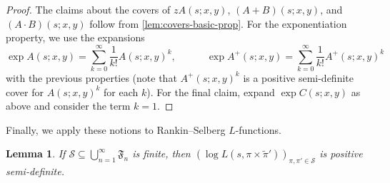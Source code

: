 \documentclass[11pt]{amsart}
\newtheorem{lemma}[theorem]{Lemma}
\theoremstyle{remark}
\numberwithin{equation}{section}
\newcommand{\mS}{\mathcal{S}}
\renewcommand{\tilde}{\widetilde}
\begin{document}
\begin{proof}
The claims about the covers of $z A(s; x, y)$, $(A+B)(s; x, y)$, and $(A \cdot B)(s; x, y)$ follow from \cref{lem:covers-basic-prop}. For the exponentiation property, we use the expansions
\[
    \exp A(s; x, y) = \sum_{k = 0}^\infty \frac{1}{k!} A(s; x, y)^k,
    \qquad\quad 
    \exp A^+(s; x, y) = \sum_{k = 0}^\infty \frac{1}{k!} A^+(s; x, y)^k
\]
with the previous properties (note that $A^+(s; x, y)^k$ is a positive semi-definite cover for $A(s; x, y)^k$ for each $k$). For the final claim, expand $\exp C(s; x, y)$ as above and consider the term $k = 1$.
\end{proof}

Finally, we apply these notions to Rankin--Selberg $L$-functions.

\begin{lemma}
If $\mathcal{S}\subseteq \bigcup_{n=1}^{\infty}\mathfrak{F}_n$ is finite, then $(\log L(s, \pi \times \tilde\pi'))_{\pi, \pi' \in \mS}$ is positive semi-definite.
\end{lemma}
\end{document}

